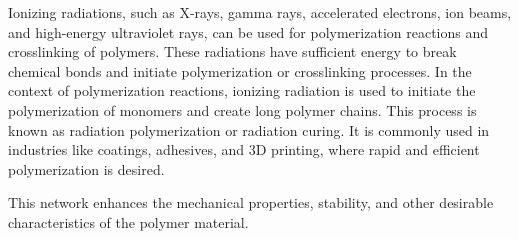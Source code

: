 \documentclass[../../main-notes.tex]{subfiles}
\begin{document}
\begin{comment}
Smart hydrogels are a subcategory that can respond to external stimuli like pH, temperature, specific molecules, solvents, or mechanical force. 
These stimuli-responsive properties allow hydrogels to act as sensors for various applications. 
Additionally, the transportation properties and injectability of hydrogels make them promising candidates for drug delivery systems [13–15]. 
They can encapsulate and release drugs in a controlled manner, which is crucial for targeted and sustained drug applications. 
This review discusses the preparation methods for hydrogels, their characterization properties, and their use in various applications.

Preparation methods of Hydrogels\footnote{
    \begin{itemize}
        \item Physical Cross-Linking
        \item Chemical Cross-Linking
        \item Irradiation based cross linking
    \end{itemize}
}

Hydrogels are composed of polymer chains, and the properties of the hydrogel are influenced by the properties of the polymer used.

Polymer chains connect through cross-links to form a 3D network in hydrogels. 

It has higher glass transition temperature due to limited rotational motion between the polymer chains. 

These kinds of polymers are insoluble but can absorb a large amount of solvent, resulting in the formation of gels.

\end{comment}


Ionizing radiations, such as X-rays, gamma rays, accelerated electrons, ion beams, and high-energy ultraviolet rays, can be used for polymerization reactions and crosslinking of polymers. 
These radiations have sufficient energy to break chemical bonds and initiate polymerization or crosslinking processes. 
In the context of polymerization reactions, ionizing radiation is used to initiate the polymerization of monomers and create long polymer chains. 
This process is known as radiation polymerization or radiation curing. 
It is commonly used in industries like coatings, adhesives, and 3D printing, where rapid and efficient polymerization is desired. 

This network enhances the mechanical properties, stability, and other desirable characteristics of the polymer material. 
\end{document}
